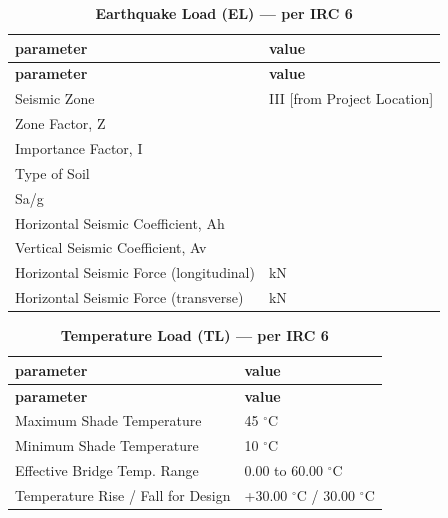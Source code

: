 \documentclass[12pt,a4paper]{report}
\numberwithin{table}{chapter}
\numberwithin{figure}{chapter}
\begin{document}
\vspace{1em}
\begin{longtable}{|L{5.5cm}|p{10.0cm}|}
\caption{\textbf{Earthquake Load (EL) --- per IRC 6}}
\hline
{} \textbf{parameter} & \textbf{value} \\
\hline
\endfirsthead
\hline
{} \textbf{parameter} & \textbf{value} \\
\hline
\endhead
\textnormal{Seismic Zone} & III [from Project Location] \\[6pt]
\hline
\textnormal{Zone Factor, Z} &  \\[6pt]
\hline
\textnormal{Importance Factor, I} &  \\[6pt]
\hline
\textnormal{Type of Soil} &  \\[6pt]
\hline
\textnormal{Sa/g} &  \\[6pt]
\hline
\textnormal{Horizontal Seismic Coefficient, Ah} &  \\[6pt]
\hline
\textnormal{Vertical Seismic Coefficient, Av} &  \\[6pt]
\hline
\textnormal{Horizontal Seismic Force (longitudinal)} &  kN \\[6pt]
\hline
\textnormal{Horizontal Seismic Force (transverse)} &  kN \\[6pt]
\hline
\end{longtable}

\vspace{1em}
\begin{longtable}{|L{5.5cm}|p{10.0cm}|}
\caption{\textbf{Temperature Load (TL) --- per IRC 6}}
\hline
{} \textbf{parameter} & \textbf{value} \\
\hline
\endfirsthead
\hline
{} \textbf{parameter} & \textbf{value} \\
\hline
\endhead
\textnormal{Maximum Shade Temperature} & 45 $^\circ$C \\[6pt]
\hline
\textnormal{Minimum Shade Temperature} & 10 $^\circ$C \\[6pt]
\hline
\textnormal{Effective Bridge Temp. Range} & 0.00 to 60.00 $^\circ$C \\[6pt]
\hline
\textnormal{Temperature Rise / Fall for Design} & +30.00 $^\circ$C / \textminus{}30.00 $^\circ$C \\[6pt]
\hline
\end{longtable}
\end{document}
